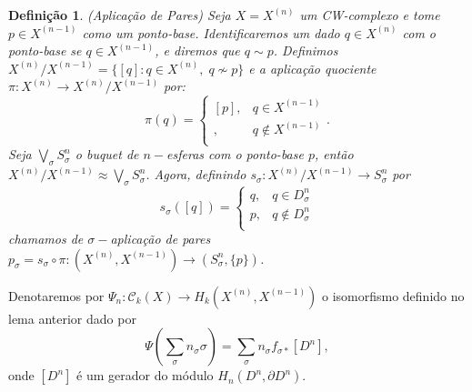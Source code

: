 \documentclass[12pt]{book}
\newtheorem{definicao}[teorema]{Definição}
\newcommand{\celula}[2]{D^{#1}_{#2}}
\newcommand{\classe}[1]{[#1]}
\newcommand{\funcaocond}[5]{
	#1 = 
	\left\{
	\begin{array}{cc}
		#2, & #3\\
		#4, & #5\\
	\end{array}
	\right.
}
\newcommand{\homologiarelcel}[3]{H_{#1}(D^{#2}_{#3}, \partial D^{#2}_{#3})}
\newcommand{\homologiarelskelesimpl}[2]{H_{#1}(X^{(#2)}, X^{(#2-1)})}
\newcommand{\skeleton}[1]{X^{(#1)}}
\begin{document}
	\begin{definicao}
		(Aplicação de Pares) Seja $X = \skeleton{n}$ um CW-complexo e tome $p \in \skeleton{n-1}$ como um ponto-base. Identificaremos um dado $q \in \skeleton{n}$ com o ponto-base se $q \in \skeleton{n-1}$, e diremos que $q \sim p$. Definimos $\skeleton{n}/\skeleton{n-1} = \{[q]: q \in \skeleton{n}, \; q \nsim p\}$ e a aplicação quociente $\pi : \skeleton{n} \to \skeleton{n}/\skeleton{n-1}$ por:
		$$
		\pi(q) = 
		\left\{
		\begin{array}{cc}
		\classe{p}, & q \in \skeleton{n-1}\\
		\classe{q}, & q \notin \skeleton{n-1}\\
		\end{array}
		\right..
		$$
		Seja $\bigvee_{\sigma} S^{n}_{\sigma}$ o buquet de $n-$esferas com o ponto-base $p$, então $\skeleton{n}/\skeleton{n-1} \approx \bigvee_{\sigma} S^{n}_{\sigma}$. Agora, definindo $s_{\sigma} : \skeleton{n}/\skeleton{n-1} \to S^{n}_{\sigma}$ por 
		$$
		\funcaocond{s_{\sigma}([q])}{q}{q \in \celula{n}{\sigma}}{p}{q \notin \celula{n}{\sigma}}
		$$
		chamamos de $\sigma-$aplicação de pares $p_{\sigma} = s_{\sigma} \circ \pi : (\skeleton{n}, \skeleton{n-1}) \to (S^{n}_{\sigma}, \{p\})$.
	\end{definicao}
	
	Denotaremos por $\Psi_{n}:\mathcal{C}_{k}(X) \to \homologiarelskelesimpl{k}{n}$ o isomorfismo definido no lema anterior dado por 
	$$
	\Psi(\sum_{\sigma} n_{\sigma} \sigma) = \sum_{\sigma} n_{\sigma} f_{\sigma *}[D^{n}],
	$$
	onde $[D^{n}]$ é um gerador do módulo $\homologiarelcel{n}{n}{}$.
	
\end{document}
